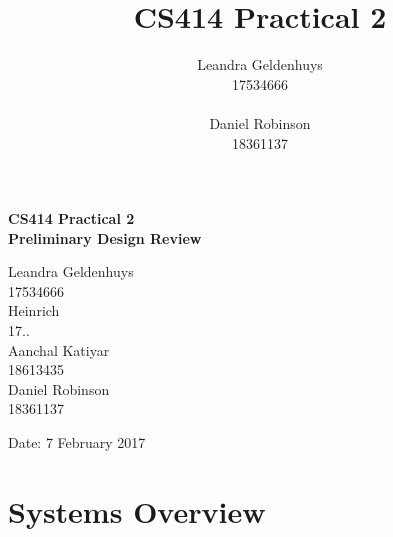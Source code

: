 


\title{CS414 Practical 2}
\author{Leandra Geldenhuys\\17534666\\\\Daniel Robinson\\18361137}


    \begin{titlepage}
        \begin{center}
            \vspace*{1cm}
            
            \huge
            \textbf{CS414 Practical 2\\Preliminary Design Review}
            
            \vspace{1.5cm}
            
            \large
            Leandra Geldenhuys\\
            17534666\\
            \vspace{2.5cm}
            Heinrich\\
            17..\\
            \vspace{2.5cm}
            Aanchal Katiyar\\
            18613435\\
            \vspace{2.5cm}
            Daniel Robinson\\
            18361137\\
            \vspace{4.5cm}
            
            \large
            Date: 7 February 2017
            
        \end{center}
\end{titlepage}

\tableofcontents
\listoffigures
\listoftables

\newpage


\section{Systems Overview}

